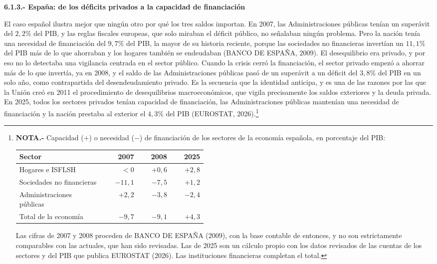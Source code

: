 \documentclass[10pt,a4paper]{article}
\begin{document}
\textbf{6.1.3.- España: de los déficits privados a la capacidad de financiación}

El caso español ilustra mejor que ningún otro por qué los tres saldos importan. En 2007, las Administraciones públicas tenían un superávit del $2{,}2\%$ del PIB, y las reglas fiscales europeas, que solo miraban el déficit público, no señalaban ningún problema. Pero la nación tenía una necesidad de financiación del $9{,}7\%$ del PIB, la mayor de su historia reciente, porque las sociedades no financieras invertían un $11{,}1\%$ del PIB más de lo que ahorraban y los hogares también se endeudaban (BANCO DE ESPAÑA, 2009). El desequilibrio era privado, y por eso no lo detectaba una vigilancia centrada en el sector público. Cuando la crisis cerró la financiación, el sector privado empezó a ahorrar más de lo que invertía, ya en 2008, y el saldo de las Administraciones públicas pasó de un superávit a un déficit del $3{,}8\%$ del PIB en un solo año, como contrapartida del desendeudamiento privado. Es la secuencia que la identidad anticipa, y es una de las razones por las que la Unión creó en 2011 el procedimiento de desequilibrios macroeconómicos, que vigila precisamente los saldos exteriores y la deuda privada. En 2025, todos los sectores privados tenían capacidad de financiación, las Administraciones públicas mantenían una necesidad de financiación y la nación prestaba al exterior el $4{,}3\%$ del PIB (EUROSTAT, 2026).\footnote{%
    \textbf{NOTA.-} Capacidad ($+$) o necesidad ($-$) de financiación de los sectores de la economía española, en porcentaje del PIB:
    \begin{center}
    \footnotesize
    \begin{tabular}{p{0.45\linewidth}rrr}
        \hline
        Sector & 2007 & 2008 & 2025 \\
        \hline
        Hogares e ISFLSH & $<0$ & $+0{,}6$ & $+2{,}8$ \\
        Sociedades no financieras & $-11{,}1$ & $-7{,}5$ & $+1{,}2$ \\
        Administraciones públicas & $+2{,}2$ & $-3{,}8$ & $-2{,}4$ \\
        \hline
        Total de la economía & $-9{,}7$ & $-9{,}1$ & $+4{,}3$ \\
        \hline
    \end{tabular}
    \end{center}
    Las cifras de 2007 y 2008 proceden de BANCO DE ESPAÑA (2009), con la base contable de entonces, y no son estrictamente comparables con las actuales, que han sido revisadas. Las de 2025 son un cálculo propio con los datos revisados de las cuentas de los sectores y del PIB que publica EUROSTAT (2026). Las instituciones financieras completan el total.
}
\end{document}
